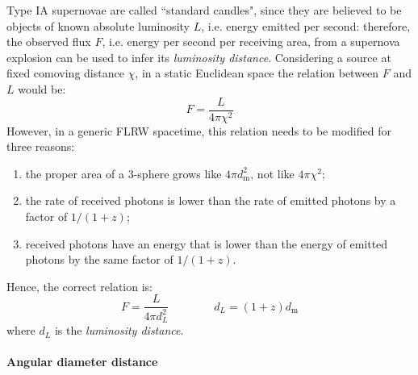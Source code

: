 Type IA supernovae are called ``standard candles", since they are believed to be objects of known absolute luminosity $ L $, i.e. energy emitted per second: therefore, the observed flux $ F $, i.e. energy per second per receiving area, from a supernova explosion can be used to infer its \emph{luminosity distance}. Considering a source at fixed comoving distance $ \chi $, in a static Euclidean space the relation between $ F $ and $ L $ would be:
\begin{equation*}
  F = \frac{L}{4\pi \chi^2}
\end{equation*}
However, in a generic FLRW spacetime, this relation needs to be modified for three reasons:
\begin{enumerate}
  \item the proper area of a 3-sphere grows like $ 4\pi d_\text{m}^2 $, not like $ 4\pi \chi^2 $;
  \item the rate of received photons is lower than the rate of emitted photons by a factor of $ 1 / (1 + z) $;
  \item received photons have an energy that is lower than the energy of emitted photons by the same factor of $ 1 / (1 + z) $.
\end{enumerate}
Hence, the correct relation is:
\begin{equation}
  F = \frac{L}{4\pi d_L^2}
  \qquad \qquad
  d_L = (1 + z) d_\text{m}
\end{equation}
where $ d_L $ is the \emph{luminosity distance}.

\paragraph{Angular diameter distance}

